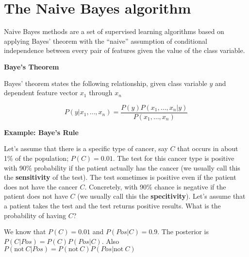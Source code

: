 \section{The Naive Bayes algorithm}
\label{naive_bayes_algo}

Naive Bayes methods are a set of supervised learning algorithms based on applying Bayes’ theorem with the “naive” assumption of conditional independence between every pair of features given the value of the class variable.


\begin{framed}
\theoremstyle{remark}
\begin{remark}{\textbf{Baye's Theorem}}

Bayes’ theorem states the following relationship, given class variable $y$ and dependent feature vector 
$x_1$ through $x_n$

\begin{equation}
P(y | x_1, \ldots , x_n ) = \frac{P(y)P(x_1, \ldots, x_n|y)}{P(x_1, \ldots, x_n)}
\end{equation}

\end{remark}
\end{framed}


\begin{framed}
\theoremstyle{example}
\begin{example}{\textbf{Example: Baye's Rule}}

Let's assume that there is a specific type of cancer, say $C$ that occurs in about 1\% of the population; $P(C) = 0.01$.
The test for this cancer type is positive with 90\% probability if the patient actually has the cancer (we usually call this the \textbf{sensitivity} of the test). The test sometimes is positive
even if the patient does not have the cancer $C$. Concretely, with 90\% chance is negative if the patient does not have $C$ (we usually call this the \textbf{specitivity}).
Let's assume that a patient takes the test and the test returns positive results. What is the probability of having $C$?

We know that $P(C) = 0.01$ and $P(Pos | C ) = 0.9$. The posterior is $P(C | Pos) = P(C)P(Pos | C)$. Also $P(\text{not}~C | Pos) =  P(\text{not}~C) P(Pos | \text{not}~C )$

\end{example}
\end{framed}





